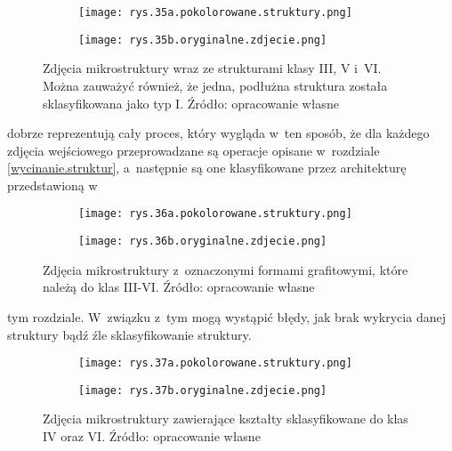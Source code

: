 \begin{figure}[h]
	\centering
	\begin{subfigure}{0.42\textwidth}
	    \centering
	    \texttt{[image: rys.35a.pokolorowane.struktury.png]}
	\end{subfigure}
	\begin{subfigure}{0.42\textwidth}
	    \centering
	    \texttt{[image: rys.35b.oryginalne.zdjecie.png]}
	\end{subfigure}
	\caption{\label{rys.35}Zdjęcia mikrostruktury wraz ze strukturami klasy III, V i~VI. Można zauważyć również, że jedna, podłużna struktura została sklasyfikowana jako typ I. Źródło: opracowanie własne}
\end{figure}
dobrze reprezentują cały proces, który wygląda w~ten sposób, że dla każdego zdjęcia wejściowego przeprowadzane są operacje opisane w~rozdziale \ref{wycinanie.struktur}, a~następnie są one klasyfikowane przez architekturę przedstawioną w~
\begin{figure}[h]
	\centering
	\begin{subfigure}{0.41\textwidth}
	    \centering
	    \texttt{[image: rys.36a.pokolorowane.struktury.png]}
	\end{subfigure}
	\begin{subfigure}{0.41\textwidth}
	    \centering
	    \texttt{[image: rys.36b.oryginalne.zdjecie.png]}
	\end{subfigure}
	\caption{\label{rys.36}Zdjęcia mikrostruktury z~oznaczonymi formami grafitowymi, które należą do klas III-VI. Źródło: opracowanie własne}
\end{figure}
tym rozdziale. W~związku z~tym mogą wystąpić błędy, jak brak wykrycia danej struktury bądź źle sklasyfikowanie struktury.
\begin{figure}[h]
	\centering
	\begin{subfigure}{0.41\textwidth}
	    \centering
	    \texttt{[image: rys.37a.pokolorowane.struktury.png]}
	\end{subfigure}
	\begin{subfigure}{0.41\textwidth}
	    \centering
	    \texttt{[image: rys.37b.oryginalne.zdjecie.png]}
	\end{subfigure}
	\caption{\label{rys.37}Zdjęcia mikrostruktury zawierające kształty sklasyfikowane do klas IV oraz VI. Źródło: opracowanie własne}
\end{figure}
